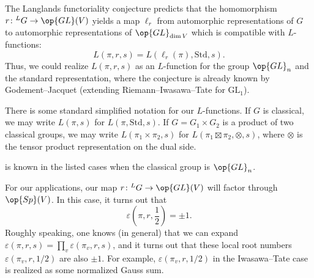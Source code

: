 \documentclass[../notes.tex]{subfiles}
\begin{document}
\begin{remark}
	The Langlands functoriality conjecture predicts that the homomorphism $r\colon{^LG}\to\op{GL}(V)$ yields a map $\ell_r$ from automorphic representations of $G$ to automorphic representations of $\op{GL}_{\dim V}$ which is compatible with $L$-functions:
	\[L(\pi,r,s)=L(\ell_r(\pi),\mathrm{Std},s).\]
	Thus, we could realize $L(\pi,r,s)$ as an $L$-function for the group $\op{GL}_n$ and the standard representation, where the conjecture is already known by Godement--Jacquet (extending Riemann--Iwasawa--Tate for $\mathrm{GL}_1$).
\end{remark}
\begin{notation}
	There is some standard simplified notation for our $L$-functions. If $G$ is classical, we may write $L(\pi,s)$ for $L(\pi,\mathrm{Std},s)$. If $G=G_1\times G_2$ is a product of two classical groups, we may write $L(\pi_1\times\pi_2,s)$ for $L(\pi_1\boxtimes\pi_2,\otimes,s)$, where $\otimes$ is the tensor product representation on the dual side.
\end{notation}
\begin{remark}
	 is known in the listed cases when the classical group is $\op{GL}_n$.
\end{remark}
For our applications, our map $r\colon{^LG}\to\op{GL}(V)$ will factor through $\op{Sp}(V)$. In this case, it turns out that
\[\varepsilon\left(\pi,r,\frac12\right)=\pm1.\]
Roughly speaking, one knows (in general) that we can expand $\varepsilon(\pi,r,s)=\prod_v\varepsilon(\pi_v,r,s)$, and it turns out that these local root numbers $\varepsilon(\pi_v,r,1/2)$ are also $\pm1$. For example, $\varepsilon(\pi_v,r,1/2)$ in the Iwasawa--Tate case is realized as some normalized Gauss sum.
\end{document}
